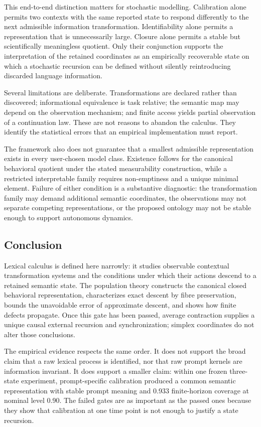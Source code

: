 \documentclass[11pt]{article}
\begin{document}
This end-to-end distinction matters for stochastic modelling. Calibration alone permits two contexts with the same reported state to respond differently to the next admissible information transformation. Identifiability alone permits a representation that is unnecessarily large. Closure alone permits a stable but scientifically meaningless quotient. Only their conjunction supports the interpretation of the retained coordinates as an empirically recoverable state on which a stochastic recursion can be defined without silently reintroducing discarded language information.

Several limitations are deliberate. Transformations are declared rather than discovered; informational equivalence is task relative; the semantic map may depend on the observation mechanism; and finite access yields partial observation of a continuation law. These are not reasons to abandon the calculus. They identify the statistical errors that an empirical implementation must report.

The framework also does not guarantee that a smallest admissible representation exists in every user-chosen model class. Existence follows for the canonical behavioral quotient under the stated measurability construction, while a restricted interpretable family requires non-emptiness and a unique minimal element. Failure of either condition is a substantive diagnostic: the transformation family may demand additional semantic coordinates, the observations may not separate competing representations, or the proposed ontology may not be stable enough to support autonomous dynamics.

\subsection{Conclusion}

Lexical calculus is defined here narrowly: it studies observable contextual
transformation systems and the conditions under which their actions descend
to a retained semantic state.  The population theory constructs the canonical
closed behavioral representation, characterizes exact descent by fibre
preservation, bounds the unavoidable error of approximate descent, and shows
how finite defects propagate.  Once this gate has been passed, average
contraction supplies a unique causal external recursion and synchronization;
simplex coordinates do not alter those conclusions.

The empirical evidence respects the same order.  It does not support the broad
claim that a raw lexical process is identified, nor that raw prompt kernels are
information invariant.  It does support a smaller claim: within one frozen
three-state experiment, prompt-specific calibration produced a common
semantic representation with stable prompt meaning and 0.933 finite-horizon
coverage at nominal level 0.90.  The failed gates are as important as the
passed ones because they show that calibration at one time point is not enough
to justify a state recursion.
\end{document}

